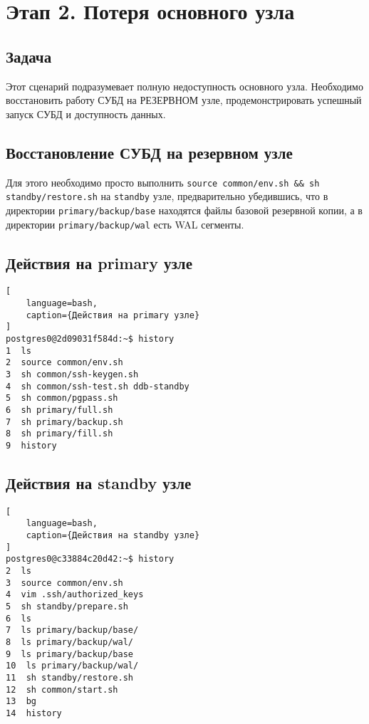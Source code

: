 \documentclass{article}
\begin{document}
\section{Этап 2. Потеря основного узла}

\subsection{Задача}

Этот сценарий подразумевает полную недоступность основного узла. Необходимо восстановить работу СУБД на РЕЗЕРВНОМ узле, продемонстрировать успешный запуск СУБД и доступность данных.

\subsection{Восстановление СУБД на резервном узле}

Для этого необходимо просто выполнить 
\texttt{source common/env.sh \&\& sh standby/restore.sh} 
на \texttt{standby} узле, предварительно убедившись, что в 
директории \texttt{primary/backup/base} находятся файлы базовой резервной копии,
а в директории \texttt{primary/backup/wal} есть WAL сегменты.



\subsection{Действия на primary узле}

\begin{lstlisting}[
    language=bash,
    caption={Действия на primary узле}
]
postgres0@2d09031f584d:~$ history
1  ls
2  source common/env.sh 
3  sh common/ssh-keygen.sh 
4  sh common/ssh-test.sh ddb-standby
5  sh common/pgpass.sh 
6  sh primary/full.sh 
7  sh primary/backup.sh 
8  sh primary/fill.sh 
9  history
\end{lstlisting}

\subsection{Действия на standby узле}

\begin{lstlisting}[
    language=bash,
    caption={Действия на standby узле}
]
postgres0@c33884c20d42:~$ history
2  ls
3  source common/env.sh
4  vim .ssh/authorized_keys 
5  sh standby/prepare.sh 
6  ls
7  ls primary/backup/base/
8  ls primary/backup/wal/
9  ls primary/backup/base
10  ls primary/backup/wal/
11  sh standby/restore.sh 
12  sh common/start.sh 
13  bg
14  history
\end{lstlisting}
\end{document}
